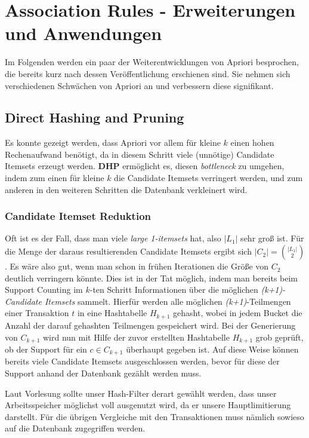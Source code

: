 \section{Association Rules - Erweiterungen und Anwendungen}
Im Folgenden werden ein paar der Weiterentwicklungen von Apriori besprochen,
die bereits kurz nach dessen Veröffentlichung erschienen sind. Sie nehmen sich
verschiedenen Schwächen von Apriori an und verbessern diese signifikant.

\subsection{Direct Hashing and Pruning}
Es konnte gezeigt werden, dass Apriori vor allem für kleine \(k\) einen
hohen Rechenaufwand benötigt, da in diesem Schritt viele (unnötige) Candidate
Itemsets erzeugt werden. \textbf{DHP} ermöglicht es, diesen \textit{bottleneck}
zu umgehen, indem zum einen für kleine \(k\) die Candidate Itemsets verringert
werden, und zum anderen in den weiteren Schritten die Datenbank verkleinert wird.

\subsubsection{Candidate Itemset Reduktion}
Oft ist es der Fall, dass man viele \textit{large 1-itemsets} hat, also \(|L_1|\)
sehr groß ist. Für die Menge der daraus resultierenden Candidate Itemsets ergibt sich
\(|C_2| = {{|L_1|} \choose 2}\). Es wäre also gut, wenn man schon in frühen Iterationen
die Größe von \(C_2\) deutlich verringern könnte. Dies ist in der Tat möglich,
indem man bereits beim Support Counting im \(k\)-ten Schritt Informationen
über die möglichen \textit{(k+1)-Candidate Itemsets} sammelt. Hierfür werden
alle möglichen \textit{(k+1)}-Teilmengen einer Transaktion \(t\) in eine 
Hashtabelle \(H_{k+1}\) gehasht, wobei in jedem Bucket die Anzahl der darauf 
gehashten Teilmengen
gespeichert wird. Bei der Generierung von \(C_{k+1}\) wird nun mit Hilfe der zuvor 
erstellten Hashtabelle \(H_{k+1}\) grob geprüft, ob der Support für ein \(c\in C_{k+1}\)
überhaupt gegeben ist. Auf diese Weise können bereits viele Candidate Itemsets
ausgeschlossen werden, bevor für diese der Support anhand der Datenbank gezählt
werden muss.

Laut Vorlesung sollte unser Hash-Filter derart gewählt werden, dass unser Arbeitsspeicher
möglichst voll ausgenutzt wird, da er unsere Hauptlimitierung darstellt. Für die
übrigen Vergleiche mit den Transaktionen muss nämlich sowieso auf die Datenbank
zugegriffen werden.

